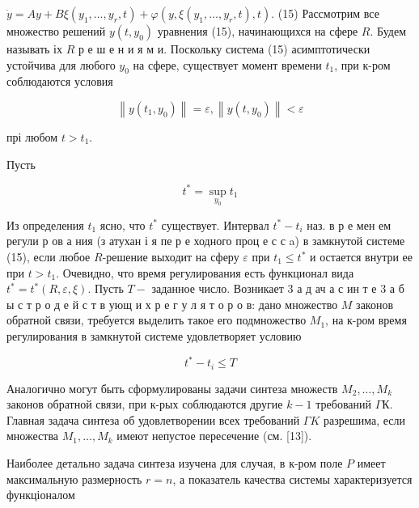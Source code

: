 \documentclass[10pt]{article}
\begin{document}
$\dot{y}=A y+B \xi\left(y_{1}, \ldots, y_{r}, t\right)+\varphi\left(y, \xi\left(y_{1}, \ldots, y_{r}, t\right), t\right)$. (15) Рассмотрим все множество решений $y\left(t, y_{0}\right)$ уравнения (15), начинающихся на сфере $R$. Будем называть іх $R$ р е ш е н и я м и. Поскольку система (15) асимптотически устойчива для любого $y_{0}$ на сфере, существует момент времени $t_{1}$, при к-ром соблюдаются условия



\[

\left\|y\left(t_{1}, y_{0}\right)\right\|=\varepsilon,\left\|y\left(t, y_{0}\right)\right\|<\varepsilon

\]



прі любом $t>t_{1}$.



Пусть



\[

t^{*}=\sup _{y_{0}} t_{1}

\]



Из определения $t_{1}$ ясно, что $t^{*}$ существует. Интервал $t^{*}-t_{i}$ наз. в р е мен ем регули р ов а ния (з атухан і я пе р е ходного проц е с с a) в замкнутой системе (15), если любое $R$-решение выходит на сферу $\varepsilon$ при $t_{1} \leqslant t^{*}$ и остается внутри ее при $t>t_{1}$. Очевидно, что время регулирования есть функционал вида $t^{*}=t^{*}(R, \varepsilon, \xi)$. Пусть $T-$ заданное число. Возникает 3 а д ач а с ин т е 3 а б ы с т р о д е й с т в ующ и х р е г у л я т о р о в: дано множество $M$ законов обратной связи, требуется выделить такое его подмножество $M_{1}$, на к-ром время регулирования в замкнутой системе удовлетворяет условию



\[

t^{*}-t_{i} \leqslant T

\]



Аналогично могут быть сформулированы задачи синтеза множеств $M_{2}, \ldots, M_{k}$ законов обратной связи, при к-рых соблюдаются другие $k-1$ требований $\Gamma К$. Главная задача синтеза об удовлетворении всех требований $\Gamma K$ разрешима, если множества $M_{1}, \ldots, M_{k}$ имеют непустое пересечение (см. [13]).



Наиболее детально задача синтеза изучена для случая, в к-ром поле $P$ имеет максимальную размерность $r=n$, а показатель качества системы характеризуется функціоналом
\end{document}
